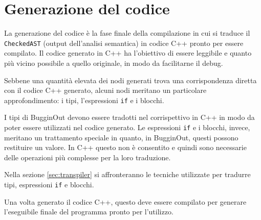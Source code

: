 \section{Generazione del codice}
\label{sec:generazione-del-codice}

La generazione del codice \`e la fase finale della compilazione in cui si traduce il \texttt{CheckedAST} (output dell'analisi semantica) in codice C++ pronto per essere compilato. Il codice generato in C++ ha l'obiettivo di essere leggibile e quanto pi\`u vicino possibile a quello originale, in modo da facilitarne il debug.

Sebbene una quantit\`a elevata dei nodi generati trova una corrispondenza diretta con il codice C++ generato, alcuni nodi meritano un particolare approfondimento: i tipi, l'espressioni \texttt{if} e i blocchi.

I tipi di BugginOut devono essere tradotti nel corrispettivo in C++ in modo da poter essere utilizzati nel codice generato. Le espressioni \texttt{if} e i blocchi, invece, meritano un trattamento speciale in quanto, in BugginOut, questi possono restituire un valore. In C++ questo non \`e consentito e quindi sono necessarie delle operazioni pi\`u complesse per la loro traduzione.

Nella sezione \ref{sec:transpiler} si affronteranno le tecniche utilizzate per tradurre tipi, espressioni \texttt{if} e blocchi.

Una volta generato il codice C++, questo deve essere compilato per generare l'eseguibile finale del programma pronto per l'utilizzo.
